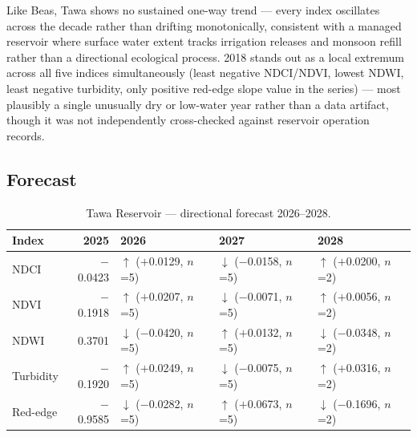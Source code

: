 \documentclass[12pt,a4paper,oneside]{report}
\begin{document}
Like Beas, Tawa shows no sustained one-way trend --- every index
oscillates across the decade rather than drifting monotonically,
consistent with a managed reservoir where surface water extent
tracks irrigation releases and monsoon refill rather than a
directional ecological process. 2018 stands out as a local extremum
across all five indices simultaneously (least negative NDCI/NDVI,
lowest NDWI, least negative turbidity, only positive red-edge slope
value in the series) --- most plausibly a single unusually dry or
low-water year rather than a data artifact, though it was not
independently cross-checked against reservoir operation records.

\subsection{Forecast}

\begin{table}[H]
\centering
\caption{Tawa Reservoir --- directional forecast 2026--2028.}
\label{tab:tawa_fc}
\begin{tabular}{lrlll}
\toprule
Index & 2025 & 2026 & 2027 & 2028 \\
\midrule
NDCI & $-$0.0423 & $\uparrow$ ($+$0.0129, $n$=5) & $\downarrow$ ($-$0.0158, $n$=5) & $\uparrow$ ($+$0.0200, $n$=2) \\
NDVI & $-$0.1918 & $\uparrow$ ($+$0.0207, $n$=5) & $\downarrow$ ($-$0.0071, $n$=5) & $\uparrow$ ($+$0.0056, $n$=2) \\
NDWI & 0.3701 & $\downarrow$ ($-$0.0420, $n$=5) & $\uparrow$ ($+$0.0132, $n$=5) & $\downarrow$ ($-$0.0348, $n$=2) \\
Turbidity & $-$0.1920 & $\uparrow$ ($+$0.0249, $n$=5) & $\downarrow$ ($-$0.0075, $n$=5) & $\uparrow$ ($+$0.0316, $n$=2) \\
Red-edge & $-$0.9585 & $\downarrow$ ($-$0.0282, $n$=5) & $\uparrow$ ($+$0.0673, $n$=5) & $\downarrow$ ($-$0.1696, $n$=2) \\
\bottomrule
\end{tabular}
\end{table}
\end{document}
